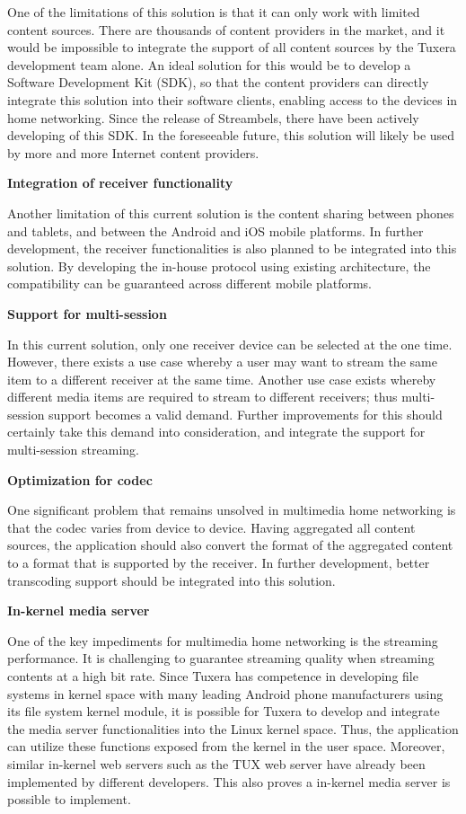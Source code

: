 One of the limitations of this solution is that it can only work with limited
content sources. There are thousands of content providers in the market, and it
would be impossible to integrate the support of all content sources by the
Tuxera development team alone. An ideal solution for this would be to develop a
Software Development Kit (SDK), so that the content providers can directly
integrate this solution into their software clients, enabling access to the
devices in home networking. Since the release of Streambels, there have been
actively developing of this SDK. In the foreseeable future, this solution will
likely be used by more and more Internet content providers.

\textbf{Integration of receiver functionality}

Another limitation of this current solution is the content sharing between
phones and tablets, and between the Android and iOS mobile platforms.
In further development, the receiver functionalities is also planned to be
integrated into this solution. By developing the in-house protocol using
existing architecture, the compatibility can be guaranteed across different
mobile platforms.

\textbf{Support for multi-session}

In this current solution, only one receiver device can be selected at the one
time. However, there exists a use case whereby a user may want to stream the
same item to a different receiver at the same time. Another use case exists
whereby different media items are required to stream to different receivers;
thus multi-session support becomes a valid demand. Further improvements
for this should certainly take this demand into consideration, and integrate the
support for multi-session streaming.

\textbf{Optimization for codec}

One significant problem that remains unsolved in multimedia home networking is
that the codec varies from device to device. Having aggregated all content
sources, the application should also convert the format of the aggregated
content to a format that is supported by the receiver. In further development,
better transcoding support should be integrated into this solution.

\textbf{In-kernel media server}

One of the key impediments for multimedia home networking is the streaming
performance. It is challenging to guarantee streaming quality when streaming
contents at a high bit rate. Since Tuxera has competence in developing file
systems in kernel space with many leading Android phone manufacturers using its
file system kernel module, it is possible for Tuxera to develop and integrate
the media server functionalities into the Linux kernel space. Thus, the
application can utilize these functions exposed from the kernel in the user
space. Moreover, similar in-kernel web servers such as the TUX web server
\cite{tux_webserver} have already been implemented by different developers.
This also proves a in-kernel media server is possible to implement.
